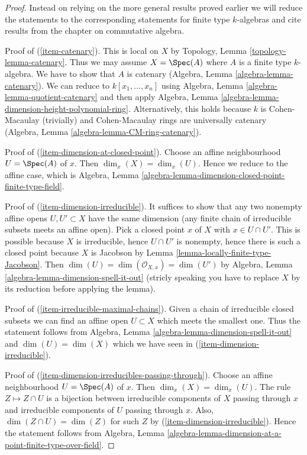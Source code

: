 \begin{proof}
Instead on relying on the more general results proved earlier
we will reduce the statements to the corresponding statements
for finite type $k$-algebras and cite results from the chapter
on commutative algebra.

\medskip\noindent
Proof of (\ref{item-catenary}). This is local on $X$ by
Topology, Lemma \ref{topology-lemma-catenary}. Thus we may
assume $X = \Spec(A)$ where $A$ is a finite type $k$-algebra.
We have to show that $A$ is catenary
(Algebra, Lemma \ref{algebra-lemma-catenary}).
We can reduce to $k[x_1, \ldots, x_n]$ using
Algebra, Lemma \ref{algebra-lemma-quotient-catenary} and then apply
Algebra, Lemma \ref{algebra-lemma-dimension-height-polynomial-ring}.
Alternatively, this holds because $k$ is Cohen-Macaulay (trivially) and
Cohen-Macaulay rings are universally catenary
(Algebra, Lemma \ref{algebra-lemma-CM-ring-catenary}).

\medskip\noindent
Proof of (\ref{item-dimension-at-closed-point}). Choose an affine
neighbourhood $U = \Spec(A)$ of $x$. Then $\dim_x(X) = \dim_x(U)$.
Hence we reduce to the affine case, which is
Algebra, Lemma \ref{algebra-lemma-dimension-closed-point-finite-type-field}.

\medskip\noindent
Proof of (\ref{item-dimension-irreducible}). It suffices to show that
any two nonempty affine opens $U, U' \subset X$ have the same dimension
(any finite chain of irreducible subsets meets an affine open).
Pick a closed point $x$ of $X$ with $x \in U \cap U'$. This is possible
because $X$ is irreducible, hence $U \cap U'$ is nonempty, hence there is
such a closed point because $X$ is Jacobson by
Lemma \ref{lemma-locally-finite-type-Jacobson}. Then
$\dim(U) = \dim(\mathcal{O}_{X, x}) = \dim(U')$ by
Algebra, Lemma \ref{algebra-lemma-dimension-spell-it-out}
(stricly speaking you have to replace $X$ by its reduction before
applying the lemma).

\medskip\noindent
Proof of (\ref{item-irreducible-maximal-chains}). Given a chain
of irreducible closed subsets we can find an affine open $U \subset X$
which meets the smallest one. Thus the statement follows from
Algebra, Lemma \ref{algebra-lemma-dimension-spell-it-out} 
and $\dim(U) = \dim(X)$ which we have seen in
(\ref{item-dimension-irreducible}).

\medskip\noindent
Proof of (\ref{item-dimension-irreducibles-passing-through}).
Choose an affine neighbourhood $U = \Spec(A)$ of $x$. Then
$\dim_x(X) = \dim_x(U)$. The rule $Z \mapsto Z \cap U$
is a bijection between irreducible components of $X$ passing through
$x$ and irreducible components of $U$ passing through $x$.
Also, $\dim(Z \cap U) = \dim(Z)$ for such $Z$ by
(\ref{item-dimension-irreducible}).
Hence the statement follows from
Algebra, Lemma \ref{algebra-lemma-dimension-at-a-point-finite-type-over-field}.


\end{proof}
